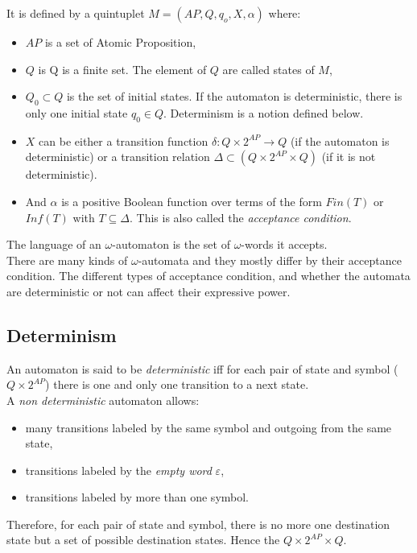 It is defined by a quintuplet $M=(AP, Q, q_o, X, \alpha)$ where:
\begin{itemize}
 \item $AP$ is a set of Atomic Proposition,
 \item $Q$ is Q is a finite set. The element of $Q$ are called states of $M$,
 \item $Q_0 \subset Q$ is the set of initial states. If the automaton is deterministic, there is only one
       initial state $q_0 \in Q$. Determinism is a notion defined below.
 \item $X$ can be either a transition function $\delta : Q \times 2^{AP} \rightarrow Q$ (if the automaton is
       deterministic) or a transition relation $\Delta \subset (Q \times 2^{AP} \times Q)$ (if it is not
       deterministic). 
 \item And $\alpha$ is a positive Boolean function over terms of the form $Fin(T)$ or $Inf(T)$ with
       $T \subseteq \Delta$. This is also called the \textit{acceptance condition}.
\end{itemize}

The language of an $\omega$-automaton is the set of $\omega$-words it accepts.\\

There are many kinds of $\omega$-automata and they mostly differ by their acceptance condition. The
different types of acceptance condition, and whether the automata are deterministic or not can affect their
expressive power.

\subsection{Determinism}
An automaton is said to be \textit{deterministic} iff for each pair of state and symbol ($Q \times 2^{AP}$)
there is one and only one transition to a next state.\\

\noindent A \textit{non deterministic} automaton allows:
\begin{itemize}
 \item many transitions labeled by the same symbol and outgoing from the same state,
 \item transitions labeled by the \textit{empty word} $\varepsilon$,
 \item transitions labeled by more than one symbol.
\end{itemize}

\noindent Therefore, for each pair of state and symbol, there is no more one destination state but a set of
possible destination states. Hence the $Q \times 2^{AP} \times Q$.

